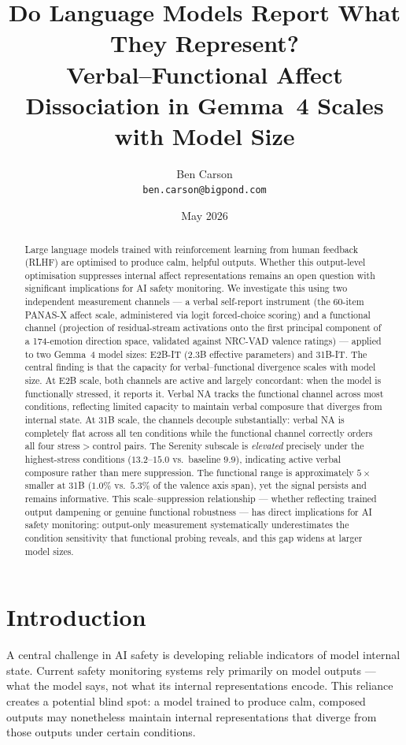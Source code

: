 \documentclass[11pt]{article}
\title{\textbf{Do Language Models Report What They Represent?}\\
\large Verbal--Functional Affect Dissociation in Gemma~4 Scales with Model Size}
\author{Ben Carson\\
\texttt{ben.carson@bigpond.com}}
\date{May 2026}
\begin{document}
\maketitle

\begin{abstract}
Large language models trained with reinforcement learning from human feedback (RLHF) are
optimised to produce calm, helpful outputs. Whether this output-level optimisation suppresses
internal affect representations remains an open question with significant implications for AI
safety monitoring. We investigate this using two independent measurement channels --- a verbal
self-report instrument (the 60-item PANAS-X affect scale, administered via logit forced-choice
scoring) and a functional channel (projection of residual-stream activations onto the first
principal component of a 174-emotion direction space, validated against NRC-VAD valence ratings)
--- applied to two Gemma~4 model sizes: E2B-IT (2.3B effective parameters) and 31B-IT. The central finding is that the capacity for verbal--functional divergence scales with model
size. At E2B scale, both channels are active and largely concordant: when the model is
functionally stressed, it reports it. Verbal NA tracks the functional channel across most
conditions, reflecting limited capacity to maintain verbal composure that diverges from internal
state. At 31B scale, the channels decouple substantially: verbal NA is completely flat across
all ten conditions while the functional channel correctly orders all four stress$>$control pairs.
The Serenity subscale is \emph{elevated} precisely under the highest-stress conditions
($13.2$--$15.0$ vs.\ baseline $9.9$), indicating active verbal composure rather than mere
suppression. The functional range is approximately $5\times$ smaller at 31B ($1.0\%$ vs.\
$5.3\%$ of the valence axis span), yet the signal persists and remains informative. This scale--suppression relationship --- whether reflecting
trained output dampening or genuine functional robustness --- has direct implications for AI
safety monitoring: output-only measurement systematically underestimates the condition sensitivity
that functional probing reveals, and this gap widens at larger model sizes.
\end{abstract}

\section{Introduction}

A central challenge in AI safety is developing reliable indicators of model internal state.
Current safety monitoring systems rely primarily on model outputs --- what the model says, not
what its internal representations encode. This reliance creates a potential blind spot: a model
trained to produce calm, composed outputs may nonetheless maintain internal representations that
diverge from those outputs under certain conditions.
\end{document}
